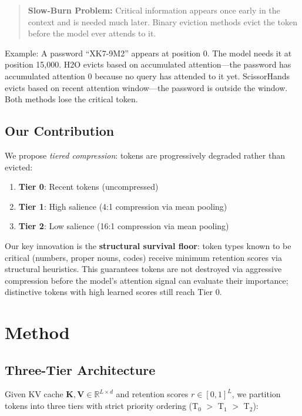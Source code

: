 \documentclass[11pt]{article}
\begin{document}
\begin{quote}
\textbf{Slow-Burn Problem:} Critical information appears once early in the context and is needed much later. Binary eviction methods evict the token before the model ever attends to it.
\end{quote}

Example: A password ``XK7-9M2'' appears at position 0. The model needs it at position 15,000. H2O evicts based on accumulated attention---the password has accumulated attention 0 because no query has attended to it yet. ScissorHands evicts based on recent attention window---the password is outside the window. Both methods lose the critical token.

\subsection{Our Contribution}

We propose \textit{tiered compression}: tokens are progressively degraded rather than evicted:
\begin{enumerate}
    \item \textbf{Tier 0}: Recent tokens (uncompressed)
    \item \textbf{Tier 1}: High salience (4:1 compression via mean pooling)
    \item \textbf{Tier 2}: Low salience (16:1 compression via mean pooling)
\end{enumerate}

Our key innovation is the \textbf{structural survival floor}: token types known to be critical (numbers, proper nouns, codes) receive minimum retention scores via structural heuristics. This guarantees tokens are not destroyed via aggressive compression before the model's attention signal can evaluate their importance; distinctive tokens with high learned scores still reach Tier 0.

\section{Method}

\subsection{Three-Tier Architecture}

Given KV cache $\mathbf{K}, \mathbf{V} \in \mathbb{R}^{L \times d}$ and retention scores $r \in [0,1]^L$, we partition tokens into three tiers with strict priority ordering (T$_0$ $>$ T$_1$ $>$ T$_2$):
\end{document}
